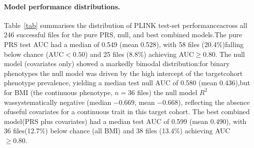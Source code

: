 \documentclass[11pt,a4paper]{article}
\begin{document}
\paragraph{Model performance distributions.}Table~\ref{tab} summarises the distribution of PLINK test-set performanceacross all 246 successful files for the pure PRS, null, and best combined models.The pure PRS test AUC had a median of 0.549 (mean 0.528), with 58 files (20.4\%)falling below chance ($\mathrm{AUC} < 0.50$) and 25 files (8.8\%) achieving AUC$\geq 0.80$. The null model (covariates only) showed a markedly bimodal distribution:for binary phenotypes the null model was driven by the high intercept of the targetcohort phenotype prevalence, yielding a median test null AUC of 0.580 (mean 0.436),but for BMI (the continuous phenotype, $n=36$ files) the null model $R^{2}$ wassystematically negative (median $-0.669$, mean $-0.668$), reflecting the absence ofuseful covariates for a continuous trait in this target cohort. The best combined model(PRS plus covariates) had a median test AUC of 0.599 (mean 0.490), with 36 files(12.7\%) below chance (all BMI) and 38 files (13.4\%) achieving AUC $\geq 0.80$.

\begin{table}[h]
\centering
\caption{PLINK C+T test-set performance distribution across 246 successful files.AUC is reported for binary phenotypes; $R^{2}$ for BMI. Values below chance for BMIreflect the negative $R^{2}$ of a continuous trait with no covariate adjustment.}
\label{tab}
\end{table}
\end{document}
